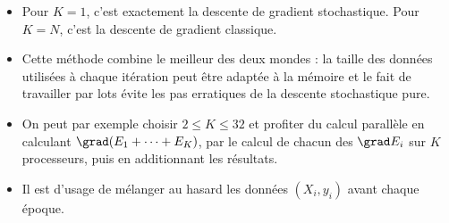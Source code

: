 	\begin{itemize}
		\item Pour $K=1$, c'est exactement la descente de gradient stochastique. Pour $K=N$, c'est la descente de gradient classique.
		
		\item Cette méthode combine le meilleur des deux mondes : la taille des données utilisées à chaque itération peut être adaptée à la mémoire et le fait de travailler par lots évite les pas erratiques de la descente stochastique pure.
		
		\item On peut par exemple choisir $2 \le K \le 32$ et profiter du calcul parallèle en calculant $\grad (E_1+\cdots + E_K)$, par le calcul de chacun des $\grad E_i$ sur $K$ processeurs, puis en additionnant les résultats.
		
		\item Il est d'usage de mélanger au hasard les données $(X_i,y_i)$ avant chaque époque.
	\end{itemize}




